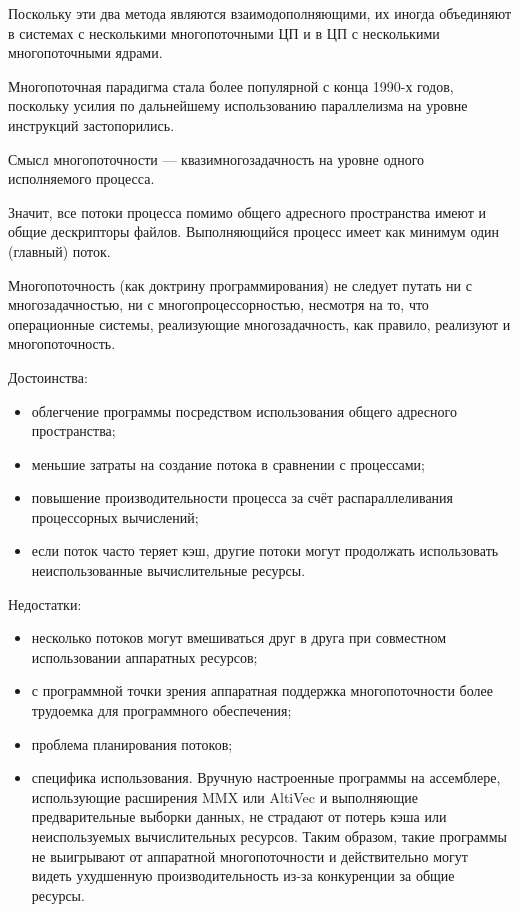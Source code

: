 \documentclass[12pt]{report}
\begin{document}
Поскольку эти два метода являются взаимодополняющими, их иногда объединяют в системах с несколькими многопоточными ЦП и в ЦП с несколькими многопоточными ядрами.


Многопоточная парадигма стала более популярной с конца 1990-х годов, поскольку усилия по дальнейшему использованию параллелизма на уровне инструкций застопорились.

Смысл многопоточности — квазимногозадачность на уровне одного исполняемого процесса.

Значит, все потоки процесса помимо общего адресного пространства имеют и общие дескрипторы файлов. Выполняющийся процесс имеет как минимум один (главный) поток.


Многопоточность (как доктрину программирования) не следует путать ни с многозадачностью, ни с многопроцессорностью, несмотря на то, что операционные системы, реализующие многозадачность, как правило, реализуют и многопоточность.


Достоинства:

\begin{itemize}

	\item облегчение программы посредством использования общего адресного пространства;

	\item меньшие затраты на создание потока в сравнении с процессами;

	\item повышение производительности процесса за счёт распараллеливания процессорных вычислений;

	\item если поток часто теряет кэш, другие потоки могут продолжать использовать неиспользованные вычислительные ресурсы.

\end{itemize}


Недостатки:

\begin{itemize}

	\item несколько потоков могут вмешиваться друг в друга при совместном использовании аппаратных ресурсов;

	\item с программной точки зрения аппаратная поддержка многопоточности более трудоемка для программного обеспечения;

	\item проблема планирования потоков;

	\item специфика использования. Вручную настроенные программы на ассемблере, использующие расширения MMX или AltiVec и выполняющие предварительные выборки данных, не страдают от потерь кэша или неиспользуемых вычислительных ресурсов. Таким образом, такие программы не выигрывают от аппаратной многопоточности и действительно могут видеть ухудшенную производительность из-за конкуренции за общие ресурсы.

\end{itemize}
\end{document}
